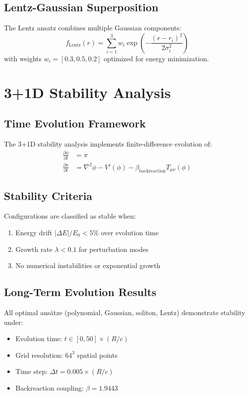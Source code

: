 \documentclass[11pt,a4paper]{article}
\begin{document}
\subsection{Lentz-Gaussian Superposition}

The Lentz ansatz combines multiple Gaussian components:
\begin{equation}
f_{\text{Lentz}}(r) = \sum_{i=1}^{3} w_i \exp\left(-\frac{(r - r_i)^2}{2\sigma_i^2}\right)
\end{equation}
with weights $w_i = [0.3, 0.5, 0.2]$ optimized for energy minimization.

\section{3+1D Stability Analysis}

\subsection{Time Evolution Framework}

The 3+1D stability analysis implements finite-difference evolution of:
\begin{align}
\frac{\partial\phi}{\partial t} &= \pi \\
\frac{\partial\pi}{\partial t} &= \nabla^2\phi - V'(\phi) - \beta_{\text{backreaction}} T_{\mu\nu}(\phi)
\end{align}

\subsection{Stability Criteria}

Configurations are classified as stable when:
\begin{enumerate}
\item Energy drift $|\Delta E|/E_0 < 5\%$ over evolution time
\item Growth rate $\lambda < 0.1$ for perturbation modes  
\item No numerical instabilities or exponential growth
\end{enumerate}

\subsection{Long-Term Evolution Results}

All optimal ansätze (polynomial, Gaussian, soliton, Lentz) demonstrate stability under:
\begin{itemize}
\item Evolution time: $t \in [0, 50] \times (R/c)$
\item Grid resolution: $64^3$ spatial points
\item Time step: $\Delta t = 0.005 \times (R/c)$
\item Backreaction coupling: $\beta = 1.9443$
\end{itemize}
\end{document}
